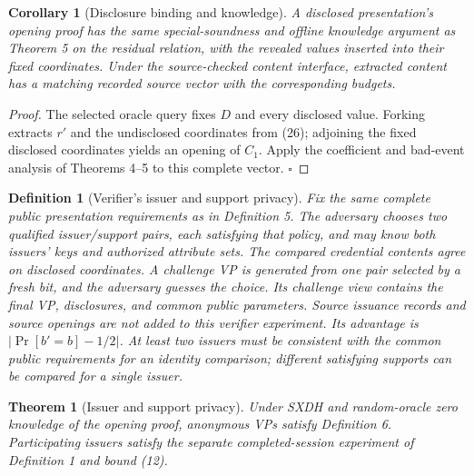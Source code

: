 \documentclass[11pt]{article}
\newtheorem{definition}{Definition}
\newtheorem{theorem}{Theorem}
\newtheorem{corollary}{Corollary}
\begin{document}
\begin{corollary}[Disclosure binding and knowledge]
A disclosed presentation's opening proof has the same special-soundness and offline knowledge argument as Theorem 5 on the residual relation, with the revealed values inserted into their fixed coordinates. Under the source-checked content interface, extracted content has a matching recorded source vector with the corresponding budgets.

\end{corollary}
\begin{proof}
The selected oracle query fixes \(D\) and every disclosed value. Forking extracts \(r'\) and the undisclosed coordinates from (26); adjoining the fixed disclosed coordinates yields an opening of \(C_1\). Apply the coefficient and bad-event analysis of Theorems 4–5 to this complete vector. \(\square\)

\end{proof}
\begin{definition}[Verifier's issuer and support privacy]
Fix the same complete public presentation requirements as in Definition 5. The adversary chooses two qualified issuer/support pairs, each satisfying that policy, and may know both issuers' keys and authorized attribute sets. The compared credential contents agree on disclosed coordinates. A challenge VP is generated from one pair selected by a fresh bit, and the adversary guesses the choice. Its challenge view contains the final VP, disclosures, and common public parameters. Source issuance records and source openings are not added to this verifier experiment. Its advantage is \(\left|\Pr[b'=b]-1/2\right|\). At least two issuers must be consistent with the common public requirements for an identity comparison; different satisfying supports can be compared for a single issuer.

\end{definition}
\begin{theorem}[Issuer and support privacy]
Under SXDH and random-oracle zero knowledge of the opening proof, anonymous VPs satisfy Definition 6. Participating issuers satisfy the separate completed-session experiment of Definition 1 and bound (12).

\end{theorem}
\end{document}
